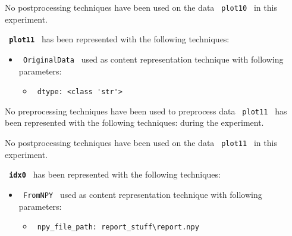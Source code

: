 \documentclass[11pt]{article}
\begin{document}
No postprocessing techniques have been used on the data \lstinline[style=verbatim-text]| plot10 | in this experiment.
\hfill\break
\hfill\break



\textbf{\lstinline[style=verbatim-text]| plot11 |} has been represented with the following techniques:
\hfill\break
\hfill\break

\begin{itemize}
                                                            
            \item
        \verb| OriginalData | used as content representation technique with following parameters:
        \begin{itemize}
                            \item
                \verb| dtype: <class 'str'>|
                    \end{itemize}
    \end{itemize}
\hfill\break
\hfill\break



No preprocessing techniques have been used to preprocess data \lstinline[style=verbatim-text]| plot11 | has been represented with the following techniques:
 during the experiment.
\hfill\break
\hfill\break



No postprocessing techniques have been used on the data \lstinline[style=verbatim-text]| plot11 | in this experiment.
\hfill\break
\hfill\break



\textbf{\lstinline[style=verbatim-text]| idx0 |} has been represented with the following techniques:
\hfill\break
\hfill\break

\begin{itemize}
                                                            
            \item
        \verb| FromNPY | used as content representation technique with following parameters:
        \begin{itemize}
                            \item
                \verb| npy_file_path: report_stuff\report.npy|
                    \end{itemize}
    \end{itemize}
\hfill\break
\hfill\break
\end{document}
